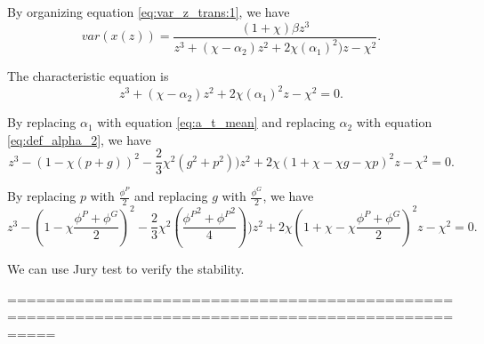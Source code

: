 \documentclass[12pt]{article}
\begin{document}
By organizing equation \eqref{eq:var_z_trans:1}, we have
\begin{equation}
\label{eq:var_z_trans:2}
var(x(z)) = \frac{(1 + \chi) \beta z^{3}}{z^{3} + (\chi - \alpha_{2} ) z^{2} + 2 \chi ( \alpha_{1} )^{2} ) z - \chi^{2} }.
\end{equation}

The characteristic equation is
\begin{equation}
\label{eq:var_characteristic}
z^{3} + (\chi - \alpha_{2} ) z^{2} + 2 \chi ( \alpha_{1} )^{2} z - \chi^{2} = 0.
\end{equation}

By replacing $ \alpha_{1} $ with equation \eqref{eq:a_t_mean} and replacing $ \alpha_{2} $ with equation \eqref{eq:def_alpha_2}, we have
\begin{equation}
\label{eq:var_characteristic:2}
z^{3} - (1 - \chi ( p + g ))^{2} - \frac{2}{3} \chi^{2} ( g^{2} + p^{2} ) ) z^{2} + 2 \chi ( 1 + \chi - \chi g - \chi p )^{2} z - \chi^{2} = 0.
\end{equation}

By replacing $ p $ with $ \frac{\phi^{P}}{2} $ and replacing $ g $ with $ \frac{\phi^{G}}{2} $, we have
\begin{equation}
\label{eq:var_characteristic:3}
z^{3} - (1 - \chi \frac{ \phi^{P} + \phi^{G} }{2} )^{2} - \frac{2}{3} \chi^{2} ( \frac{ {\phi^{P}}^{2} + {\phi^{P}}^{2} }{4} ) ) z^{2} + 2 \chi ( 1 + \chi - \chi \frac{ \phi^{P} + \phi^{G} }{2} )^{2} z - \chi^{2} = 0.
\end{equation}



We can use Jury test to verify the stability.




=================================================================================================
\end{document}
